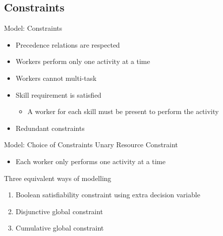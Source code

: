 \documentclass{beamer}
\begin{document}
\subsection{Constraints}
\begin{frame}{Model: Constraints}
	\begin{itemize}
		\item \pause Precedence relations are respected\pause
		\vspace{2mm}
		\item Workers perform only one activity at a time\pause
		\vspace{2mm}
		\item Workers cannot multi-task\pause
		\vspace{2mm}
		\item Skill requirement is satisfied
		\begin{itemize}
			\item A worker for each skill must be present to perform the activity\pause
		\end{itemize}
		\vspace{2mm}
		\item Redundant constraints
	\end{itemize}
\end{frame}

\begin{frame}{Model: Choice of Constraints}
	Unary Resource Constraint
	\vspace{1mm}
	\begin{itemize}
		\item Each worker only performs one activity at a time\pause
	\end{itemize}
	\vspace{5mm}
	Three equivalent ways of modelling\pause
	\vspace{1mm}
	\begin{enumerate}
		\item Boolean satisfiability constraint using extra decision variable\pause
		\vspace{1mm}
		\item Disjunctive global constraint\pause
		\vspace{1mm}
		\item Cumulative global constraint
	\end{enumerate}
\end{frame}
\end{document}
